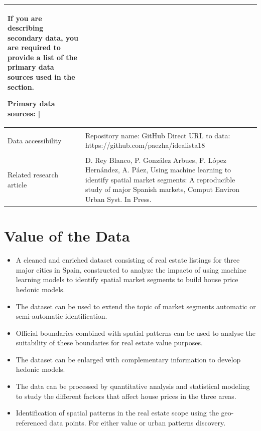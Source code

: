 \documentclass[times,final]{elsarticle}
\begin{document}
{\begin{longtable}{|p{33mm}|p{94mm}|}
                         If you are describing secondary data, you are required to provide a list of
                         the primary data sources used in the section.\newline

                         Primary data sources:  ]\\
\hline
\hypertarget{target1}
{Data accessibility}   & Repository name: GitHub\newline
                         Direct URL to data: https://github.com/paezha/idealista18\newline
                         \\
\hline
Related
research\newline
article                & D. Rey Blanco, P. González Arbues, F. López Hernández, A. Páez, Using machine learning to identify spatial market segments: A reproducible study of major Spanish markets, Comput Environ Urban Syst. In Press.\newline
\end{longtable}
}

\section*{Value of the Data}

\begin{itemize}
\itemsep=0pt
\parsep=0pt
  \item A cleaned and enriched dataset consisting of real estate listings for three major cities in Spain, constructed to analyze the impacto of using machine learning models to identify spatial market segments to build house price hedonic models.
  \item The dataset can be used to extend the topic of market segments automatic or semi-automatic identification.
    \item Official boundaries combined with spatial patterns can be used to analyse the suitability of these boundaries for real estate value purposes.
  \item The dataset can be enlarged with complementary information to develop hedonic models.
  \item The data can be processed by quantitative analysis and statistical modeling to study the different factors that affect house prices in the three areas.
  \item Identification of spatial patterns in the real estate scope using the geo-referenced data points. For either value or urban patterns discovery.
\end{itemize}
\end{document}
